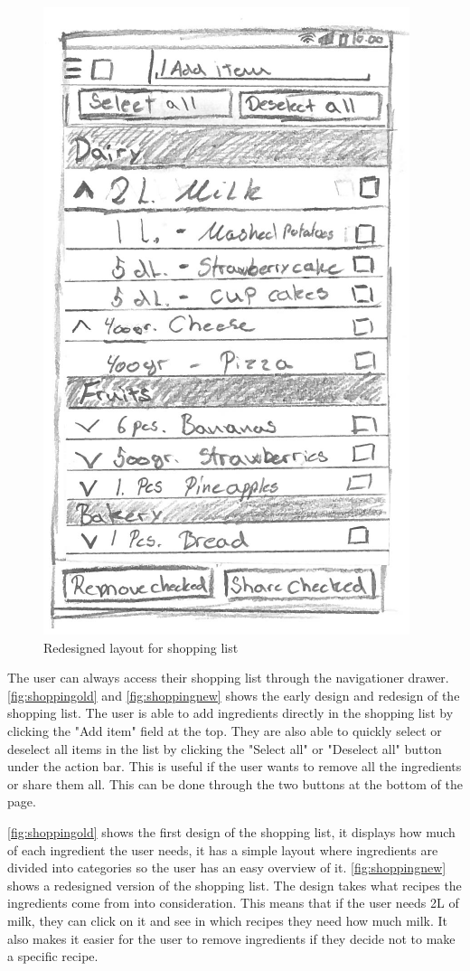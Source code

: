 \begin{figure}[H]
\begin{minipage}[b]{0.5\columnwidth}
\includegraphics[width=0.7\columnwidth]{img/prototypes/shopping_list_new.pdf}
\caption{Redesigned layout for shopping list\label{fig:shoppingnew}}
\end{minipage}
\end{figure}

The user can always access their shopping list through the navigationer drawer. \autoref{fig:shoppingold} and \autoref{fig:shoppingnew} shows the early design and redesign of the shopping list. The user is able to add ingredients directly in the shopping list by clicking the "Add item" field at the top. They are also able to quickly select or deselect all items in the list by clicking the "Select all" or "Deselect all" button under the action bar. This is useful if the user wants to remove all the ingredients or share them all. This can be done through the two buttons at the bottom of the page. 

\autoref{fig:shoppingold} shows the first design of the shopping list, it displays how much of each ingredient the user needs, it has a simple layout where ingredients are divided into categories so the user has an easy overview of it. \autoref{fig:shoppingnew} shows a redesigned version of the shopping list. The design takes what recipes the ingredients come from into consideration. This means that if the user needs 2L of milk, they can click on it and see in which recipes they need how much milk. It also makes it easier for the user to remove ingredients if they decide not to make a specific recipe.

